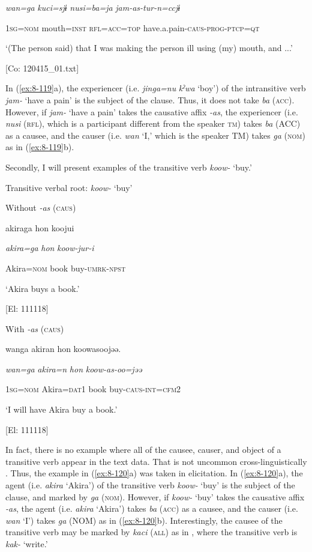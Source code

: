     \textit{wan=ga}  \textit{kuci=sjɨ}  \textit{nusi=ba=ja}  \textit{jam-as{}-tur-n=ccjɨ}

    1\textsc{sg}=\textsc{nom}  mouth=\textsc{inst}  \textsc{rfl}=\textsc{acc}=\textsc{top}  have.a.pain-\textsc{caus}-\textsc{prog}-\textsc{ptcp}=\textsc{qt}

    ‘(The person\textit{\textsubscript{} }said) that I was making the person ill using (my) mouth, and ...’

    [Co: 120415\_01.txt]
\z

In (\ref{ex:8-119}a), the experiencer (i.e. \textit{jinga=nu} \textit{kˀwa} ‘boy’) of the intransitive verb \textit{jam-} ‘have a pain’ is the subject of the clause. Thus, it does not take \textit{ba} (\textsc{acc}). However, if \textit{jam-} ‘have a pain’ takes the causative affix \textit{{}-as}, the experiencer (i.e. \textit{nusi} (\textsc{rfl}), which is a participant different from the speaker \textsc{tm}) takes \textit{ba} (ACC) as a causee, and the causer (i.e. \textit{wan} ‘I,’ which is the speaker TM) takes \textit{ga} (\textsc{nom}) as in (\ref{ex:8-119}b).

  Secondly, I will present examples of the transitive verb \textit{koow-} ‘buy.’

\textbf{\ea\label{ex:8-120}
}  Transitive verbal root: \textit{koow-} ‘buy’

\ea Without \textit{-as} (\textsc{caus})

  {\TM}
\glll  akiraga  {\textbar}hon{\textbar}  koojui

    \textit{akira=ga}  \textit{hon}  \textit{koow{}-jur-i}

    Akira=\textsc{nom}  book  buy-\textsc{umrk}-\textsc{npst}

    ‘Akira buys a book.’

    [El: 111118]

\ex With \textit{-as} (\textsc{caus})

  {\TM}
\glll  wanga  akiran  {\textbar}hon{\textbar}  koowasoojəə.

    \textit{wan=ga}  \textit{akira=n}  \textit{hon}  \textit{koow-as{}-oo=jəə}

    1\textsc{sg}=\textsc{nom}  Akira=\textsc{dat}1  book  buy-\textsc{caus}-\textsc{int}=\textsc{cfm}2

    ‘I will have Akira buy a book.’

    [El: 111118]

In fact, there is no example where all of the causee, causer, and object of a transitive verb appear in the text data. That is not uncommon cross-linguistically \citep[79]{Dryer2007}. Thus, the example in (\ref{ex:8-120}a) was taken in elicitation. In (\ref{ex:8-120}a), the agent (i.e. \textit{akira} ‘Akira’) of the transitive verb \textit{koow-} ‘buy’ is the subject of the clause, and marked by \textit{ga} (\textsc{nom}). However, if \textit{koow-} ‘buy’ takes the causative affix \textit{{}-as}, the agent (i.e. \textit{akira} ‘Akira’) takes \textit{ba} (\textsc{acc}) as a causee, and the causer (i.e. \textit{wan} ‘I’) takes \textit{ga} (NOM) as in (\ref{ex:8-120}b). Interestingly, the causee of the transitive verb may be marked by \textit{kaci} (\textsc{all}) as in , where the transitive verb is \textit{kak-} ‘write.’

